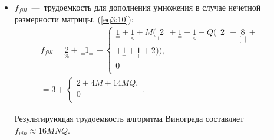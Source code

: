 \begin{itemize}
	\item $f_{fill}$~---~трудоемкость для дополнения умножения в случае нечетной размерности матрицы. (\ref{eq3:10}):
	\begin{multline}
		\label{eq3:10}
		f_{fill} = {\underset{\%}{2}} + {\underset{==}{1}} + 
		\begin{cases}
			{\underset{=}{1}} + {\underset{<}{1}} + M({\underset{++}{2}} + {\underset{=}{1}} + {\underset{<}{1}} + Q({\underset{++}{2}} + {\underset{[\ ]}{8}} + \\
			+ {\underset{=}{1}} + {\underset{+}{1}} + {\underset{-}{2}})),\\
			0\\
		\end{cases} = \\
		= 3 + \begin{cases}
			2 + 4M + 14MQ,\\
			0\\
		\end{cases}.
	\end{multline}
	
	Результирующая трудоемкость алгоритма Винограда составляет \newline $f_{vin} \approx 16MNQ$.
\end{itemize}
